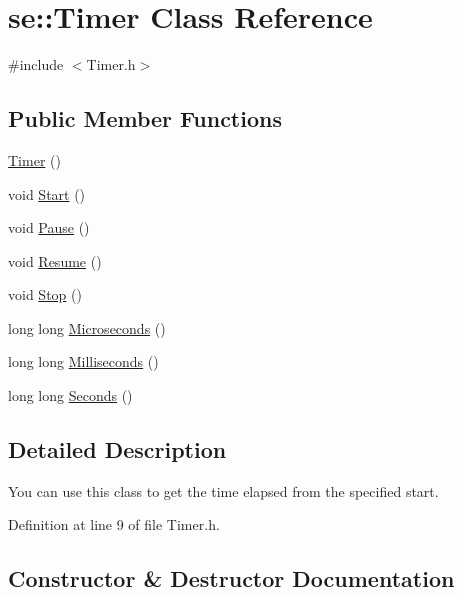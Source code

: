 \hypertarget{classse_1_1_timer}{}\section{se\+:\+:Timer Class Reference}
\label{classse_1_1_timer}


{\ttfamily \#include $<$Timer.\+h$>$}

\subsection*{Public Member Functions}
\begin{DoxyCompactItemize}
\item 
\mbox{\hyperlink{classse_1_1_timer_a0f3bf62bd9419c252910191f13669dd7}{Timer}} ()
\item 
void \mbox{\hyperlink{classse_1_1_timer_a0294f5629a28a1e169a8d1b5ab179273}{Start}} ()
\item 
void \mbox{\hyperlink{classse_1_1_timer_abde91d5d6e7fe0601c0c9607193707d8}{Pause}} ()
\item 
void \mbox{\hyperlink{classse_1_1_timer_a432406f463e02336c1033d65ae1d746e}{Resume}} ()
\item 
void \mbox{\hyperlink{classse_1_1_timer_aed6b34f75ec989731c80fefe962493f3}{Stop}} ()
\item 
long long \mbox{\hyperlink{classse_1_1_timer_a7fdf38aafc8be894fc25764ff8cabb36}{Microseconds}} ()
\item 
long long \mbox{\hyperlink{classse_1_1_timer_a9c3fe064b6637f2804c370da786a38d8}{Milliseconds}} ()
\item 
long long \mbox{\hyperlink{classse_1_1_timer_a258761c48271338588503d8170532bde}{Seconds}} ()
\end{DoxyCompactItemize}


\subsection{Detailed Description}
You can use this class to get the time elapsed from the specified start. 

Definition at line 9 of file Timer.\+h.



\subsection{Constructor \& Destructor Documentation}
\mbox{\label{classse_1_1_timer_a0f3bf62bd9419c252910191f13669dd7}} 
